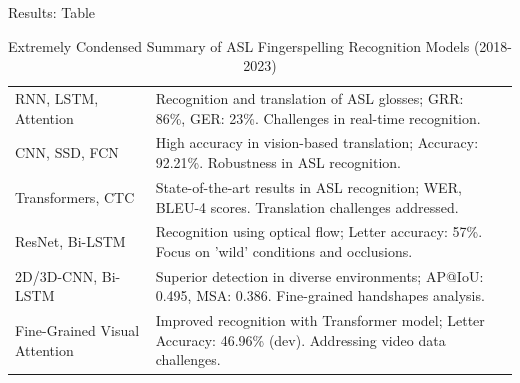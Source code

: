 \documentclass[xcolor={cmyk}]{beamer} %
\begin{document}
\begin{frame}[t]
\begin{columns}[t]
\begin{column}{0.3\textwidth}
\begin{block}{Results: Table}
\begin{footnotesize}
\begin{table}[H]
\begin{tabular}{p{} p{} p{}}
							RNN, LSTM, Attention          & Recognition and translation of ASL glosses; GRR: 86\%, GER: 23\%. Challenges in real-time recognition.         & \cite{skumarTimeSeriesNeural2018}                  \\
							CNN, SSD, FCN                 & High accuracy in vision-based translation; Accuracy: 92.21\%. Robustness in ASL recognition.                   & \cite{abiyevReconstructionConvolutionalNeural2020} \\
							Transformers, CTC             & State-of-the-art results in ASL recognition; WER, BLEU-4 scores. Translation challenges addressed.             & \cite{cihancamgozSignLanguageTransformers2020}     \\
							ResNet, Bi-LSTM               & Recognition using optical flow; Letter accuracy: 57\%. Focus on 'wild' conditions and occlusions.              & \cite{kabadeAmericanSignLanguage2023}              \\
							2D/3D-CNN, Bi-LSTM            & Superior detection in diverse environments; AP@IoU: 0.495, MSA: 0.386. Fine-grained handshapes analysis.       & \cite{shiFingerspellingDetectionAmerican2021}      \\
							Fine-Grained Visual Attention & Improved recognition with Transformer model; Letter Accuracy: 46.96\% (dev). Addressing video data challenges. & \cite{gajurelFineGrainedVisualAttention2021}       \\

							\bottomrule
						\end{tabular}
						\caption{Extremely Condensed Summary of ASL Fingerspelling Recognition Models (2018-2023)}
					\end{table}
				\end{footnotesize}
			\end{block}



\end{column}
\end{columns}
\end{frame}
\end{document}
